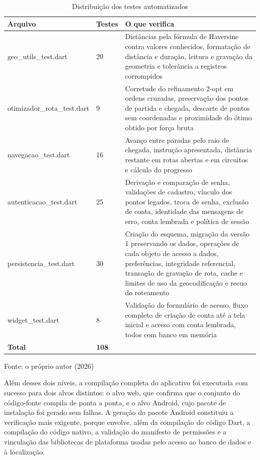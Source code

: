 \begin{table}[!ht]
    \centering
    \caption{Distribuição dos testes automatizados}
    \label{tab:testes}
    \begin{tabular}{p{5cm}p{2cm}p{8cm}}
        \hline
        \textbf{Arquivo} & \textbf{Testes} & \textbf{O que verifica} \\
        \hline
        geo\_utils\_test.dart & 20 & Distâncias pela fórmula de Haversine contra valores conhecidos, formatação de distância e duração, leitura e gravação da geometria e tolerância a registros corrompidos \\
        otimizador\_rota\_test.dart & 9 & Corretude do refinamento 2-opt em ordens cruzadas, preservação dos pontos de partida e chegada, descarte de pontos sem coordenadas e proximidade do ótimo obtido por força bruta \\
        navegacao\_test.dart & 16 & Avanço entre paradas pelo raio de chegada, instrução apresentada, distância restante em rotas abertas e em circuitos e cálculo do progresso \\
        autenticacao\_test.dart & 25 & Derivação e comparação de senha, validações de cadastro, vínculo dos pontos legados, troca de senha, exclusão de conta, identidade das mensagens de erro, conta lembrada e política de sessão \\
        persistencia\_test.dart & 30 & Criação do esquema, migração da versão 1 preservando os dados, operações de cada objeto de acesso a dados, preferências, integridade referencial, transação de gravação de rota, cache e limites de uso da geocodificação e recuo do roteamento \\
        widget\_test.dart & 8 & Validação do formulário de acesso, fluxo completo de criação de conta até a tela inicial e acesso com conta lembrada, todos com banco em memória \\
        \hline
        \textbf{Total} & \textbf{108} & \\
        \hline
    \end{tabular}
    \vspace{2pt}
    \footnotesize Fonte: o próprio autor (2026)
\end{table}

Além desses dois níveis, a compilação completa do aplicativo foi executada com sucesso para dois alvos distintos: o alvo web, que confirma que o conjunto do código-fonte compila de ponta a ponta, e o alvo Android, cujo pacote de instalação foi gerado sem falhas. A geração do pacote Android constituiu a verificação mais exigente, porque envolve, além da compilação do código Dart, a compilação do código nativo, a validação do manifesto de permissões e a vinculação das bibliotecas de plataforma usadas pelo acesso ao banco de dados e à localização.

